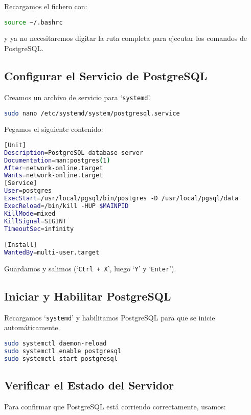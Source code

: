 \documentclass{article}
\begin{document}
Recargamos el fichero con:

\begin{lstlisting}[language=bash]
source ~/.bashrc
\end{lstlisting}

y ya no necesitaremos digitar la ruta completa para ejecutar los comandos de PostgreSQL.



\subsection{Configurar el Servicio de PostgreSQL}
Creamos un archivo de servicio para `\texttt{systemd}'.

\begin{lstlisting}[language=bash]
sudo nano /etc/systemd/system/postgresql.service
\end{lstlisting}

Pegamos el siguiente contenido:

\begin{lstlisting}[language=bash]
[Unit]
Description=PostgreSQL database server
Documentation=man:postgres(1)
After=network-online.target
Wants=network-online.target
[Service]
User=postgres
ExecStart=/usr/local/pgsql/bin/postgres -D /usr/local/pgsql/data
ExecReload=/bin/kill -HUP $MAINPID
KillMode=mixed
KillSignal=SIGINT
TimeoutSec=infinity

[Install]
WantedBy=multi-user.target
\end{lstlisting}

Guardamos y salimos (`\texttt{Ctrl + X}', luego `\texttt{Y}' y `\texttt{Enter}').

\subsection{Iniciar y Habilitar PostgreSQL}
Recargamos `\texttt{systemd}' y habilitamos PostgreSQL para que se inicie automáticamente.

\begin{lstlisting}[language=bash]
sudo systemctl daemon-reload
sudo systemctl enable postgresql
sudo systemctl start postgresql
\end{lstlisting}

\subsection{Verificar el Estado del Servidor}
Para confirmar que PostgreSQL está corriendo correctamente, usamos:
\end{document}
